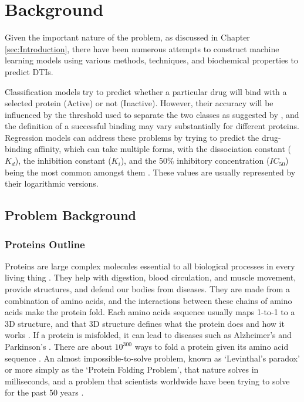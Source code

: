 \section{Background}
\label{sec:Background}

Given the important nature of the problem, as discussed in Chapter \ref{sec:Introduction}, there have been numerous attempts to construct machine learning models using various methods, techniques, and biochemical properties to predict DTIs.

Classification models try to predict whether a particular drug will bind with a selected protein (Active) or not (Inactive). However, their accuracy will be influenced by the threshold used to separate the two classes as suggested by \cite{Shar2016}, and the definition of a successful binding may vary substantially for different proteins. Regression models can address these problems by trying to predict the drug-binding affinity, which can take multiple forms, with the dissociation constant ($K_d$), the inhibition constant ($K_i$), and the 50\% inhibitory concentration ($IC_{50}$) being the most common amongst them \citep{Jiang2020}. These values are usually represented by their logarithmic versions.

\subsection{Problem Background}

\subsubsection{Proteins Outline}

Proteins are large complex molecules essential to all biological processes in every living thing \citep{AlphaFold_Blog, CellBiologyEssentials}. They help with digestion, blood circulation, and muscle movement, provide structures, and defend our bodies from diseases. They are made from a combination of amino acids, and the interactions between these chains of amino acids make the protein fold. Each amino acids sequence usually maps 1-to-1 to a 3D structure, and that 3D structure defines what the protein does and how it works \citep{LexFridmanVideo}. If a protein is misfolded, it can lead to diseases such as Alzheimer's and Parkinson's \citep{Misfolding_Diseases}. There are about $10^{300}$ ways to fold a protein given its amino acid sequence \citep{Levinthal1969}. An almost impossible-to-solve problem, known as `Levinthal's paradox' or more simply as the `Protein Folding Problem', that nature solves in milliseconds, and a problem that scientists worldwide have been trying to solve for the past 50 years \citep{AlphaFold_Blog, Torrisi2020}. 

